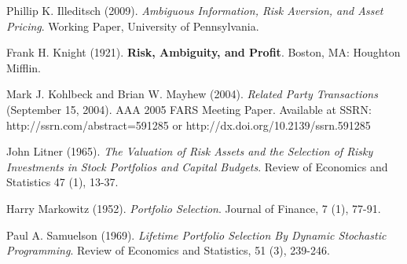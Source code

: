 \documentclass[10.0pt]{article}
\begin{document}
\begin{thebibliography}{99}
 Phillip K. Illeditsch (2009). {\it Ambiguous Information, Risk Aversion, and Asset Pricing}. Working Paper, University of Pennsylvania.



 Frank H. Knight (1921). {\bf Risk, Ambiguity, and Profit}. Boston, MA: Houghton Mifflin.

 Mark J. Kohlbeck and Brian W. Mayhew (2004). {\it Related Party Transactions} (September 15, 2004). AAA 2005 FARS Meeting Paper. Available at SSRN: http://ssrn.com/abstract=591285 or http://dx.doi.org/10.2139/ssrn.591285

 John Litner (1965). {\it The Valuation of Risk Assets and the Selection of Risky Investments in Stock Portfolios and Capital Budgets}. Review of Economics and Statistics 47 (1), 13-37.


 Harry Markowitz (1952). {\it Portfolio Selection}. Journal of Finance, 7 (1), 77-91.





 Paul A. Samuelson (1969). {\it Lifetime Portfolio Selection By Dynamic Stochastic Programming}. Review of Economics and Statistics, 51 (3), 239-246.


\end{thebibliography}
\end{document}
